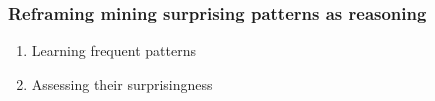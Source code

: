 \documentclass{beamer}
\begin{document}
\begin{frame}
  \frametitle{Reframing \alert{mining surprising patterns as
      reasoning}}







  \begin{enumerate}
  \item Learning \alert{frequent} patterns
  \item Assessing their \alert{surprisingness}
  \end{enumerate}

\end{frame}
\end{document}
